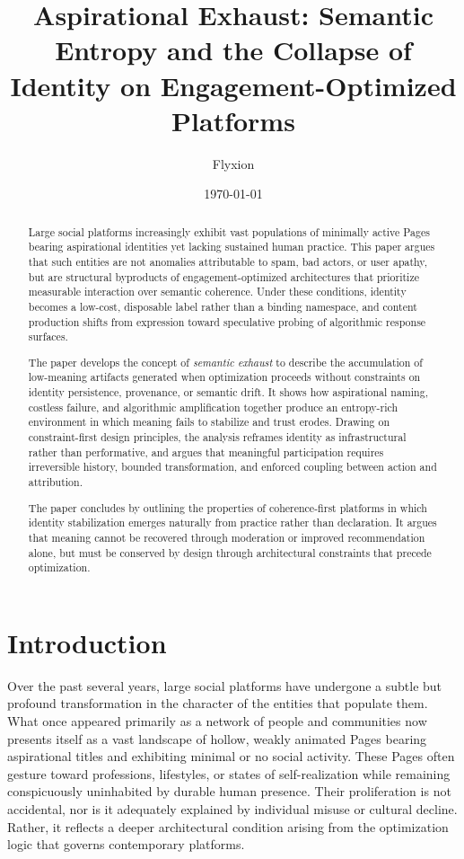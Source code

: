 \documentclass[11pt,oneside]{article}
\title{Aspirational Exhaust: Semantic Entropy and the Collapse of Identity on Engagement-Optimized Platforms}
\author{Flyxion}
\date{\today}
\begin{document}
\maketitle

\begin{abstract}
Large social platforms increasingly exhibit vast populations of minimally active Pages bearing aspirational identities yet lacking sustained human practice. This paper argues that such entities are not anomalies attributable to spam, bad actors, or user apathy, but are structural byproducts of engagement-optimized architectures that prioritize measurable interaction over semantic coherence. Under these conditions, identity becomes a low-cost, disposable label rather than a binding namespace, and content production shifts from expression toward speculative probing of algorithmic response surfaces.

The paper develops the concept of \emph{semantic exhaust} to describe the accumulation of low-meaning artifacts generated when optimization proceeds without constraints on identity persistence, provenance, or semantic drift. It shows how aspirational naming, costless failure, and algorithmic amplification together produce an entropy-rich environment in which meaning fails to stabilize and trust erodes. Drawing on constraint-first design principles, the analysis reframes identity as infrastructural rather than performative, and argues that meaningful participation requires irreversible history, bounded transformation, and enforced coupling between action and attribution.

The paper concludes by outlining the properties of coherence-first platforms in which identity stabilization emerges naturally from practice rather than declaration. It argues that meaning cannot be recovered through moderation or improved recommendation alone, but must be conserved by design through architectural constraints that precede optimization.
\end{abstract}


\section{Introduction}

Over the past several years, large social platforms have undergone a subtle but profound transformation in the character of the entities that populate them. What once appeared primarily as a network of people and communities now presents itself as a vast landscape of hollow, weakly animated Pages bearing aspirational titles and exhibiting minimal or no social activity. These Pages often gesture toward professions, lifestyles, or states of self-realization while remaining conspicuously uninhabited by durable human presence. Their proliferation is not accidental, nor is it adequately explained by individual misuse or cultural decline. Rather, it reflects a deeper architectural condition arising from the optimization logic that governs contemporary platforms.
\end{document}
